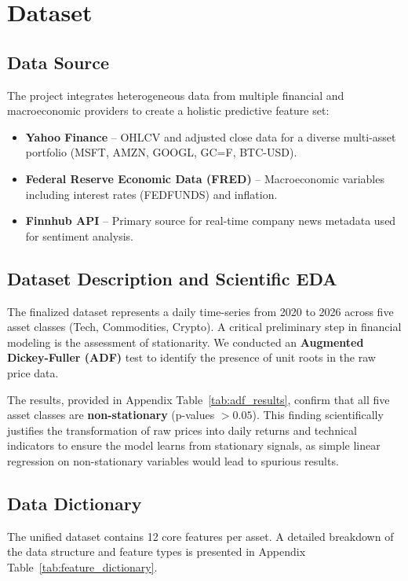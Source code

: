 \chapter{Dataset}

\section{Data Source}
The project integrates heterogeneous data from multiple financial and macroeconomic providers to create a holistic predictive feature set:
\begin{itemize}\setlength\itemsep{2pt}
    \item \textbf{Yahoo Finance} -- OHLCV and adjusted close data for a diverse multi-asset portfolio (MSFT, AMZN, GOOGL, GC=F, BTC-USD).
    \item \textbf{Federal Reserve Economic Data (FRED)} -- Macroeconomic variables including interest rates (FEDFUNDS) and inflation.
    \item \textbf{Finnhub API} -- Primary source for real-time company news metadata used for sentiment analysis.
\end{itemize}

\section{Dataset Description and Scientific EDA}
The finalized dataset represents a daily time-series from 2020 to 2026 across five asset classes (Tech, Commodities, Crypto). A critical preliminary step in financial modeling is the assessment of stationarity. We conducted an \textbf{Augmented Dickey-Fuller (ADF)} test to identify the presence of unit roots in the raw price data.

The results, provided in Appendix Table~\ref{tab:adf_results}, confirm that all five asset classes are \textbf{non-stationary} (p-values $> 0.05$). This finding scientifically justifies the transformation of raw prices into daily returns and technical indicators to ensure the model learns from stationary signals, as simple linear regression on non-stationary variables would lead to spurious results.

\section{Data Dictionary}
The unified dataset contains 12 core features per asset. A detailed breakdown of the data structure and feature types is presented in Appendix Table~\ref{tab:feature_dictionary}.
